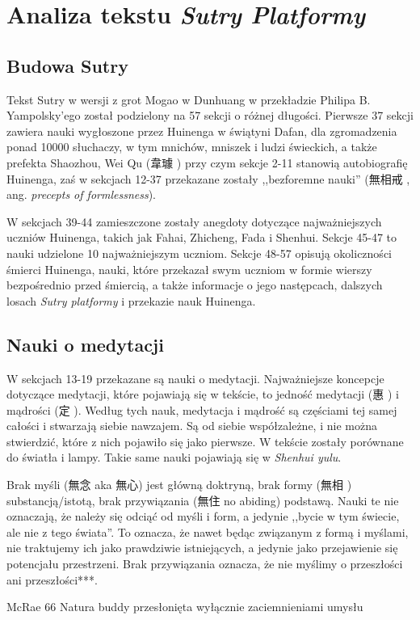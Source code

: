 \chapter{Analiza tekstu \textit{Sutry Platformy}}

\section{Budowa Sutry}
Tekst Sutry w wersji z grot Mogao w Dunhuang w przekładzie Philipa B. Yampolsky'ego został podzielony na 57 sekcji o różnej długości. Pierwsze 37 sekcji zawiera nauki wygłoszone przez Huinenga w świątyni Dafan, dla zgromadzenia ponad 10000 słuchaczy, w tym mnichów, mniszek i ludzi świeckich, a także prefekta Shaozhou, Wei Qu (韋璩 ) przy czym sekcje 2-11 stanowią autobiografię Huinenga, zaś w sekcjach 12-37 przekazane zostały ,,bezforemne nauki'' (無相戒 , ang. \textit{precepts of formlessness}).

W sekcjach 39-44 zamieszczone zostały anegdoty dotyczące najważniejszych uczniów Huinenga, takich jak Fahai, Zhicheng, Fada i Shenhui. Sekcje 45-47 to nauki udzielone 10 najważniejszym uczniom. Sekcje 48-57 opisują okoliczności śmierci Huinenga, nauki, które przekazał swym uczniom w formie wierszy bezpośrednio przed śmiercią, a także informacje o jego następcach, dalszych losach \textit{Sutry platformy} i przekazie nauk Huinenga.

\section{Nauki o medytacji}
W sekcjach 13-19 przekazane są nauki o medytacji. Najważniejsze koncepcje dotyczące medytacji, które pojawiają się w tekście, to jedność medytacji (惠 ) i mądrości (定 ). Według tych nauk, medytacja i mądrość są częściami tej samej całości i stwarzają siebie nawzajem. Są od siebie współzależne, i nie można stwierdzić, które z nich pojawiło się jako pierwsze. W tekście zostały porównane do światła i lampy. Takie same nauki pojawiają się w \textit{Shenhui yulu}.

Brak myśli (無念 aka 無心) jest główną doktryną, brak formy (無相 ) substancją/istotą, brak przywiązania (無住 no abiding) podstawą. Nauki te nie oznaczają, że należy się odciąć od myśli i form, a jedynie ,,bycie w tym świecie, ale nie z tego świata''. To oznacza, że nawet będąc związanym z formą i myślami, nie traktujemy ich jako prawdziwie istniejących, a jedynie jako przejawienie się potencjału przestrzeni. Brak przywiązania oznacza, że nie myślimy o przeszłości ani przeszłości***.

McRae 66
Natura buddy przesłonięta wyłącznie zaciemnieniami umysłu
\fi
